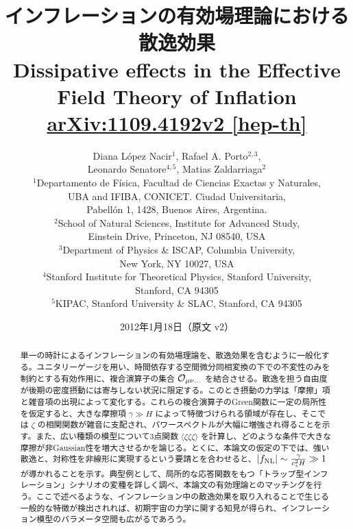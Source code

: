 \documentclass[a4paper,11pt]{ltjsarticle}
\title{\bfseries インフレーションの有効場理論における散逸効果\\[0.5em]
\large Dissipative effects in the Effective Field Theory of Inflation\\[0.4em]
\normalsize \href{https://arxiv.org/pdf/1109.4192v2}{arXiv:1109.4192v2 [hep-th]}}
\author{\parbox{\textwidth}{\centering
Diana L\'opez Nacir$^{1}$, Rafael A. Porto$^{2,3}$,\\
Leonardo Senatore$^{4,5}$, Matias Zaldarriaga$^{2}$\\[0.8em]
\small
$^1$Departamento de F\'isica, Facultad de Ciencias Exactas y Naturales,\\
UBA and IFIBA, CONICET. Ciudad Universitaria,\\
Pabell\'on 1, 1428, Buenos Aires, Argentina.\\[0.3em]
$^2$School of Natural Sciences, Institute for Advanced Study,\\
Einstein Drive, Princeton, NJ 08540, USA\\[0.3em]
$^3$Department of Physics \& ISCAP, Columbia University,\\
New York, NY 10027, USA\\[0.3em]
$^4$Stanford Institute for Theoretical Physics, Stanford University,\\
Stanford, CA 94305\\[0.3em]
$^5$KIPAC, Stanford University \& SLAC, Stanford, CA 94305
}}
\date{2012年1月18日（原文 v2）}
\numberwithin{equation}{section}
\newcommand{\calo}{{\cal O}}
\begin{document}
\maketitle
\begin{abstract}
単一の時計によるインフレーションの有効場理論を、散逸効果を含むように一般化する。ユニタリーゲージを用い、時間依存する空間微分同相変換の下での不変性のみを制約とする有効作用に、複合演算子の集合 $\calo_{\mu\nu\ldots}$ を結合させる。散逸を担う自由度が後期の密度摂動には寄与しない状況に限定する。このとき摂動の力学は「摩擦」項と雑音項の出現によって変化する。これらの複合演算子のGreen関数に一定の局所性を仮定すると、大きな摩擦項 $\gamma\gg H$ によって特徴づけられる領域が存在し、そこでは $\zeta$ の相関関数が雑音に支配され、パワースペクトルが大幅に増強され得ることを示す。また、広い種類の模型について3点関数 $\langle\zeta\zeta\zeta\rangle$ を計算し、どのような条件で大きな摩擦が非Gaussian性を増大させるかを論じる。とくに、本論文の仮定の下では、強い散逸と、対称性を非線形に実現するという要請とを合わせると、$|f_{\rm NL}|\sim\frac{\gamma}{c_s^2H}\gg1$ が導かれることを示す。典型例として、局所的な応答関数をもつ「トラップ型インフレーション」シナリオの変種を詳しく調べ、本論文の有効理論とのマッチングを行う。ここで述べるような、インフレーション中の散逸効果を取り入れることで生じる一般的な特徴が検出されれば、初期宇宙の力学に関する知見が得られ、インフレーション模型のパラメータ空間も広がるであろう。
\end{abstract}
\clearpage
\hypertarget{toc}{}
\tableofcontents
\clearpage



\clearpage

\clearpage
\renewcommand{\refname}{\hyperlink{toc}{参考文献}}


\end{document}
